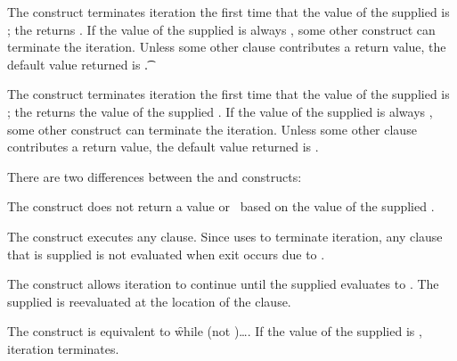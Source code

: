 The  construct terminates iteration the first time that
the value of the supplied  is ; the  returns 
\nil.                                         
If the value of the supplied  is always  \nil, some other 
construct can terminate the iteration.  
Unless some other clause contributes 
a return value, the default value returned is \t.
 
The  construct terminates iteration the first time that the
value of the supplied  is ; the  returns the
value of the supplied .
If the value of the supplied  
is always  \nil, some other
construct can terminate the iteration.  Unless some other clause contributes a 
return value, the default value returned is \nil.
 
 
There are two differences between the  and 
constructs: 
 
\beginlist
\itemitem{\bull} The  construct does not return a value or 
\nil\ based on the value of the supplied .
 
\itemitem{\bull} The  construct executes 
any  clause.
Since  uses
to terminate iteration,
any  clause that is supplied is not evaluated
when exit occurs due to .
 
\endlist
 
 
 
The  construct allows iteration to continue until the 
supplied  
evaluates to .  The supplied  
is reevaluated at the location of the  clause.
 
The  construct is equivalent to 
\f{while (not )\dots}.  If the value of the
supplied  is , iteration terminates.

